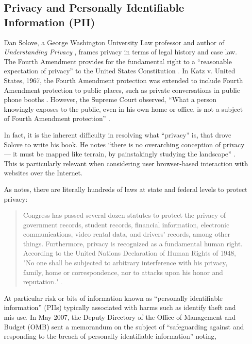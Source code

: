 \subsection{Privacy and Personally Identifiable Information (PII)}
\label{pii}


Dan Solove, a George Washington University Law professor and author of \emph{Understanding Privacy}  \citeyearpar{Solove:2008vz},  frames privacy in terms of legal history and case law. The Fourth Amendment provides for the fundamental right to a ``reasonable expectation of privacy'' to the United States Constitution  \citep[as cited in][p. 2]{Solove:2008vz}.  In Katz v. United States, 1967, the Fourth Amendment protection was extended to include Fourth Amendment protection to public places, such as private conversations in public phone booths  \citep[as cited in][p. 22]{Solove:2008vz}.  However, the Supreme Court observed, ``What a person knowingly exposes to the public, even in his own home or office, is not a subject of Fourth Amendment protection''  \citep[as cited in][p. 22]{Solove:2008vz}. 

In fact, it is the inherent difficulty in resolving what ``privacy'' is, that drove Solove to write his book. He notes ``there is no overarching conception of privacy --- it must be mapped like terrain, by painstakingly studying the landscape''  \citep[p. ix]{Solove:2008vz}.  This is particularly relevant when considering user browser-based interaction with websites over the Internet.

As  \cite{Solove:2008vz}  notes, there are literally hundreds of laws at state and federal levels to protect privacy:

\begin{quote}
Congress has passed several dozen statutes to protect the privacy of government records, student records, financial information, electronic communications, video rental data, and drivers' records, among other things. Furthermore, privacy is recognized as a fundamental human right. According to the United Nations Declaration of Human Rights of 1948, "No one shall be subjected to arbitrary interference with his privacy, family, home or correspondence, nor to attacks upon his honor and reputation." \citep[p. 3]{Solove:2008vz}.
\end{quote}

At particular risk or bits of information known as ``personally identifiable information'' (PIIs) typically associated with harms such as identify theft and mis-use. In May 2007, the Deputy Directory of the Office of Management and Budget (OMB) sent a memorandum on the subject of ``safeguarding against and responding to the breach of personally identifiable information'' noting,

